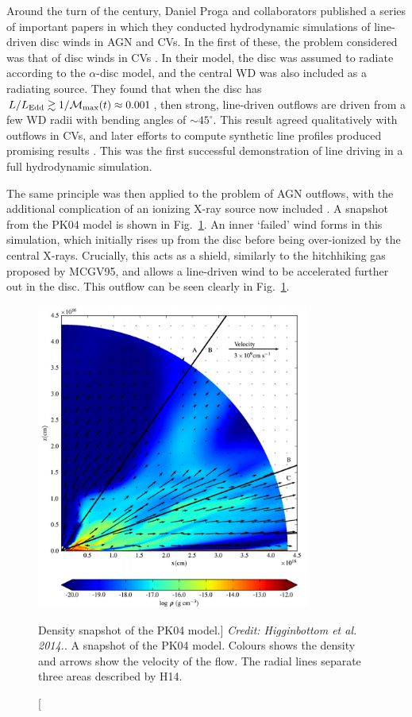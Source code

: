 Around the turn of the century, Daniel Proga and collaborators 
published a series of important papers in which they conducted 
hydrodynamic simulations of line-driven disc winds in AGN and CVs. 
In the first of these, the problem considered was that of disc
winds in CVs \citep{proga1998}. In their model, the disc was assumed
to radiate according to the $\alpha$-disc model, and the central WD was also included
as a radiating source. They found that when the disc has 
$L / L_{\mathrm{Edd}} \gtrsim 1 / {\cal M}_{\mathrm{max}} (t) \approx 0.001$, 
then strong, line-driven
outflows are driven from a few WD radii with bending angles of $\sim45^\circ$.
This result agreed qualitatively with outflows in CVs, and later efforts to compute
synthetic line profiles produced promising results \citep{proga2002}. This was the
first successful demonstration of line driving in a full hydrodynamic simulation.

The same principle was then applied to the problem of AGN outflows, with the
additional complication of an ionizing X-ray source now included 
\citep[][hereafter PK04]{PSK2000,PK04}. A snapshot from the PK04 model
is shown in Fig.~\ref{fig:PK04}. An inner `failed' wind forms in this simulation,
which initially rises up from the disc before being over-ionized by the central X-rays.
Crucially, this acts as a shield, similarly to the hitchhiking gas proposed by
MCGV95, and allows a line-driven wind to be accelerated further out in the disc. 
This outflow can be seen clearly in Fig.~\ref{fig:PK04}. 

\begin{figure}
\centering
\includegraphics[width=0.8\textwidth]{figures/02-outflows/pk04_h14.png}
\caption
[Density snapshot of the PK04 model.]
{
{\sl Credit: Higginbottom et al. 2014.}. 
A snapshot of the PK04 model. Colours shows the density and 
arrows show the velocity of the flow. 
The radial lines separate three areas described by H14.
} 
\label{fig:PK04}
\end{figure}

